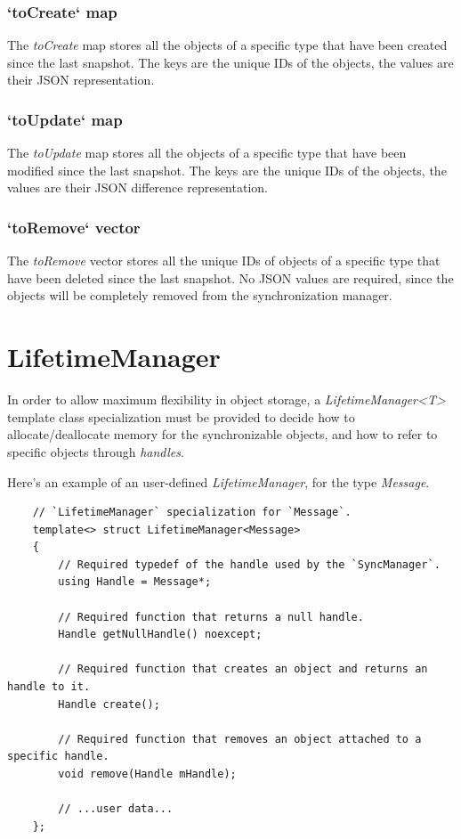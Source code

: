 \documentclass{report}
\def \cppStart {\begin{verbatim}}
\begin{document}
                \subsubsection{`toCreate` map}

                    The \emph{toCreate} map stores all the objects of a specific type that have been created since the last snapshot.
                    The keys are the unique IDs of the objects, the values are their JSON representation.

                \subsubsection{`toUpdate` map}

                    The \emph{toUpdate} map stores all the objects of a specific type that have been modified since the last snapshot.
                    The keys are the unique IDs of the objects, the values are their JSON difference representation.

                \subsubsection{`toRemove` vector}

                    The \emph{toRemove} vector stores all the unique IDs of objects of a specific type that have been deleted since the last snapshot.
                    No JSON values are required, since the objects will be completely removed from the synchronization manager.
        
        \section{LifetimeManager}

            In order to allow maximum flexibility in object storage, a \emph{LifetimeManager<T>} template class specialization must be provided to decide how to allocate/deallocate memory for the synchronizable objects, and how to refer to specific objects through \emph{handles}.

            Here's an example of an user-defined \emph{LifetimeManager}, for the type \emph{Message}.

\cppStart    
    // `LifetimeManager` specialization for `Message`.
    template<> struct LifetimeManager<Message>
    {
        // Required typedef of the handle used by the `SyncManager`.
        using Handle = Message*;

        // Required function that returns a null handle.
        Handle getNullHandle() noexcept;

        // Required function that creates an object and returns an handle to it.
        Handle create();

        // Required function that removes an object attached to a specific handle.
        void remove(Handle mHandle);
        
        // ...user data...
    };
\end{verbatim}
\end{document}
